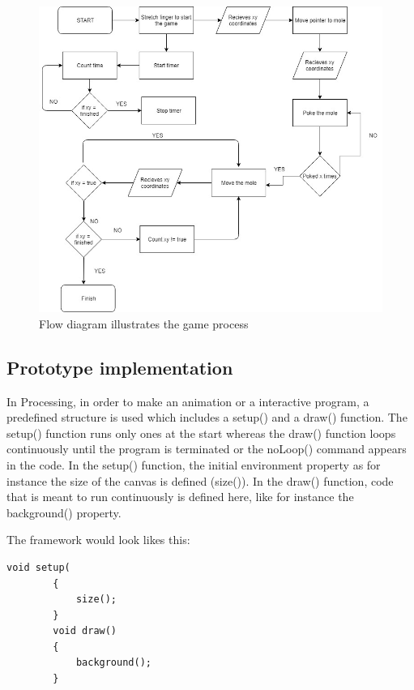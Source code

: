 \begin{figure}[h]
    \centering
    \includegraphics[width=.8\textwidth]{figures/FlowDiagram.jpg}
    \caption[Flow diagram: game design]{Flow diagram illustrates the game process}
    \label{fig: flowdiagram}
\end{figure}


\subsection{Prototype implementation}

In Processing, in order to make an animation or a interactive program, a predefined structure is used which includes a setup() and a draw() function. The setup() function runs only ones at the start whereas the draw() function loops continuously until the program is terminated or the noLoop() command appears in the code.
In the setup() function, the initial environment property as for instance the size of the canvas is defined  (size()).  In the draw() function, code that is meant to run continuously is defined here, like for instance the background() property. 

The framework would look likes this:
\lstset{frameround=tttt}
\lstset{frame=single}
\lstset{xleftmargin=.05\textwidth, xrightmargin=.05\textwidth}
\lstset{language=Java}
\begin{lstlisting}[caption = {Processing framework}, label={lst:Java}]
        void setup(
        {
            size();
        }
        void draw()
        {
            background();
        }

\end{lstlisting}


